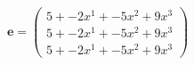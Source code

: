 \documentclass[preview]{standalone}
\begin{document}
\begin{align*}
\mathbf{e} = \begin{pmatrix}5 + -2x^{1} + -5x^{2} + 9x^{3} \\ 5 + -2x^{1} + -5x^{2} + 9x^{3} \\ 5 + -2x^{1} + -5x^{2} + 9x^{3}\end{pmatrix}
\end{align*}
\end{document}

